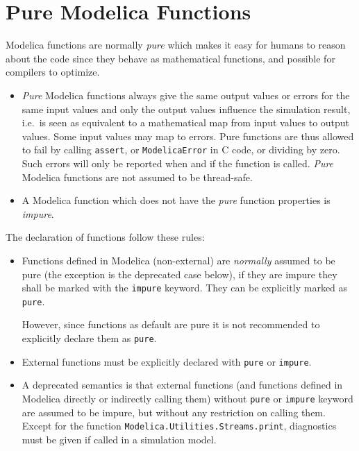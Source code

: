 \section{Pure Modelica Functions}\label{pure-modelica-functions}

Modelica functions are normally \emph{pure} which makes it easy for
humans to reason about the code since they behave as mathematical
functions, and possible for compilers to optimize.

\begin{itemize}
\item
  \emph{Pure} Modelica functions always give the same output values or
  errors for the same input values and only the output values influence
  the simulation result, i.e.\ is seen as equivalent to a mathematical
  map from input values to output values. Some input values may map to
  errors. Pure functions are thus allowed to fail by calling \lstinline!assert!, or
  \lstinline[language=C]!ModelicaError! in C code, or dividing by zero. Such errors will only be
  reported when and if the function is called.  \emph{Pure} Modelica
  functions are not assumed to be thread-safe.
\item
  A Modelica function which does not have the \emph{pure} function
  properties is \emph{impure}.
\end{itemize}

The declaration of functions follow these rules:
\begin{itemize}
\item
  Functions defined in Modelica (non-external) are \emph{normally} assumed to be pure (the exception is the deprecated case below), if they are impure they shall be marked with the \lstinline!impure! keyword.
  They can be explicitly marked as \lstinline!pure!.
  \begin{nonnormative}
  However, since functions as default are pure it is not recommended to explicitly declare them as \lstinline!pure!.
  \end{nonnormative}
\item
  External functions must be explicitly declared with \lstinline!pure! or \lstinline!impure!.
\item
  A deprecated semantics is that external functions (and functions defined in Modelica directly or indirectly calling them) without \lstinline!pure! or \lstinline!impure! keyword are assumed to be
  impure, but without any restriction on calling them.  Except for the function \lstinline!Modelica.Utilities.Streams.print!, diagnostics must be given if called in a simulation model.
\end{itemize}

